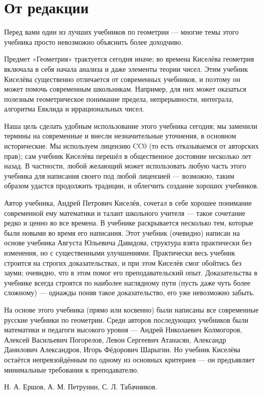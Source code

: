 \section*{От редакции}


Перед вами один из лучших учебников по геометрии —
многие темы этого учебника просто невозможно объяснить более доходчиво.

Предмет «Геометрия» трактуется сегодня иначе;
во времена Киселёва геометрия включала в себя начала анализа и даже элементы теории чисел.
Этим учебник Киселёва существенно отличается от современных учебников, и поэтому он может помочь современным школьникам.
Например, для них может оказаться полезным геометрическое понимание предела, непрерывности, интеграла, алгоритма Евклида и иррациональных чисел.

Наша цель сделать удобным использование этого учебника сегодня;
мы заменили термины на современные и внесли незначительные уточнения, в основном исторические. 
Мы используем лицензию CC0 (то есть отказываемся от авторских прав); сам учебник Киселёва перешёл в общественное достояние несколько лет назад.
В частности, любой желающий может использовать любую часть этого учебника для написания своего под любой лицензией —
возможно, таким образом удастся продолжить традиции, и облегчить создание хороших учебников. 

Автор учебника, Андрей Петрович Киселёв, сочетал в себе хорошее понимание современной ему математики и талант школьного учителя — такое сочетание редко и ценно во все времена.
В учебнике раскрывается несколько тем, которые были новыми во время его написания. 
Этот учебник (очевидно) написан на основе учебника Августа Юльевича Давидова, структура взята практически без изменения, но с существенными улучшениями.
Практически весь учебник строится на строгих доказательствах, и при этом Киселёв смог обойтись без зауми;
очевидно, что в этом помог его преподавательский опыт.
Доказательства в учебнике всегда строятся по наиболее наглядному пути (пусть даже чуть более сложному) — однажды поняв такое доказательство, его уже невозможно забыть. 

На основе этого учебника (прямо или косвенно) были написаны все современные русские учебники по геометрии.
Среди авторов последующих учебников были математики и педагоги высокого уровня — 
Андрей Николаевич Колмогоров, 
Алексей Васильевич Погорелов, 
Левон Сергеевич Атанасян, 
Александр Данилович Александров, 
Игорь Фёдорович Шарыгин.
Но учебник Киселёва остаётся непревзойдённым по одному из основных критериев —
он предъявляет минимальные требования к преподавателю.

\begin{flushright}
Н. А. Ершов,
А. М. Петрунин, 
С. Л. Табачников.        
\end{flushright}
\clearpage
